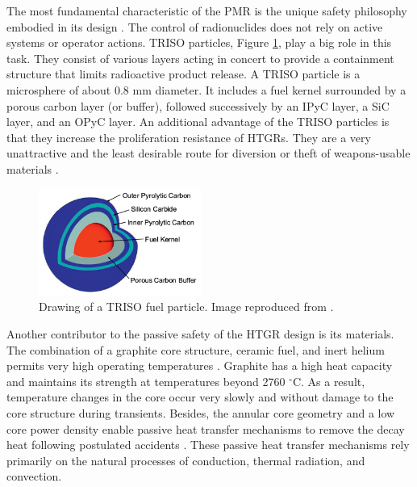\documentclass[11pt,letterpaper]{article}
\begin{document}
The most fundamental characteristic of the \gls{PMR} is the unique safety philosophy embodied in its design \cite{iaea_current_2001}.
The control of radionuclides does not rely on active systems or operator actions.
\gls{TRISO} particles, Figure \ref{fig:triso}, play a big role in this task.
They consist of various layers acting in concert to provide a containment structure that limits radioactive product release.
A \gls{TRISO} particle is a microsphere of about 0.8 mm diameter.
It includes a fuel kernel surrounded by a porous carbon layer (or buffer), followed successively by an \gls{IPyC} layer, a \gls{SiC} layer, and an \gls{OPyC} layer.
An additional advantage of the \gls{TRISO} particles is that they increase the proliferation resistance of \glspl{HTGR}.
They are a very unattractive and the least desirable route for diversion or theft of weapons-usable materials \cite{huning_steady_2014}.

\begin{figure}[htbp!]
	\centering
	\includegraphics[height=3.5cm]{figures/triso}
	\caption{Drawing of a TRISO fuel particle. Image reproduced from \cite{hales_multidimensional_2013}.}
	\label{fig:triso}
\end{figure}

Another contributor to the passive safety of the \gls{HTGR} design is its materials.
The combination of a graphite core structure, ceramic fuel, and inert helium permits very high operating temperatures \cite{ballinger_balance_2004}.
Graphite has a high heat capacity and maintains its strength at temperatures beyond 2760 $^{\circ}$C.
As a result, temperature changes in the core occur very slowly and without damage to the core structure during transients.
Besides, the annular core geometry and a low core power density enable passive heat transfer mechanisms to remove the decay heat following postulated accidents \cite{neylan_modular_1988}.
These passive heat transfer mechanisms rely primarily on the natural processes of conduction, thermal radiation, and convection.
\end{document}
